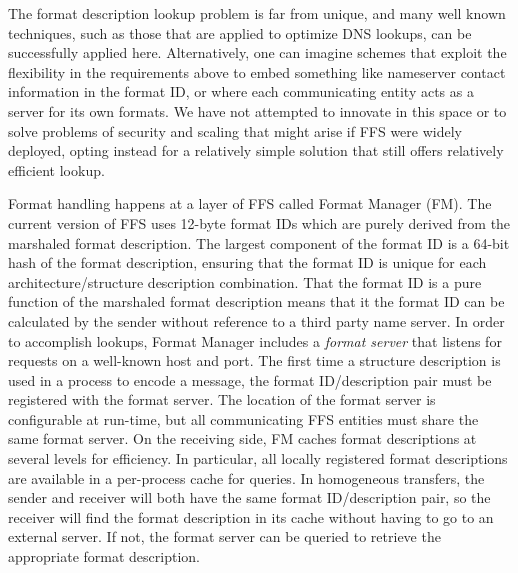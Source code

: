 The format description lookup problem is far from unique, and many well
known techniques, such as those that are applied to optimize DNS lookups,
can be successfully applied here.  Alternatively, one can imagine schemes
that exploit the flexibility in the requirements above to embed something
like nameserver contact information in the format ID, or where each
communicating entity acts as a server for its own formats.  We have not
attempted to innovate in this space or to solve problems of security and
scaling that might arise if FFS were widely deployed, opting instead for a
relatively simple solution that still offers relatively efficient lookup.

Format handling happens at a layer of FFS called Format Manager (FM).  The
current version of FFS uses 12-byte format IDs which are purely derived from
the marshaled format description.  The largest component of the format ID is
a 64-bit hash of the format description, ensuring that the format ID is
unique for each architecture/structure description combination.  That the
format ID is a pure function of the marshaled format description means that
it the format ID can be calculated by the sender without reference to a
third party name server.  In order to accomplish lookups, Format Manager
includes a {\em format server} that listens for requests on a well-known
host and port.  The first time a structure description is used in a process
to encode a message, the format ID/description pair must be registered with
the format server.  The location of the format server is configurable at
run-time, but all communicating FFS entities must share the same format
server.  On the receiving side, FM caches format descriptions at several
levels for efficiency.  In particular, all locally registered format
descriptions are available in a per-process cache for queries.  In
homogeneous transfers, the sender and receiver will both have the same
format ID/description pair, so the receiver will find the format description
in its cache without having to go to an external server.  If not, the format
server can be queried to retrieve the appropriate format description.  

